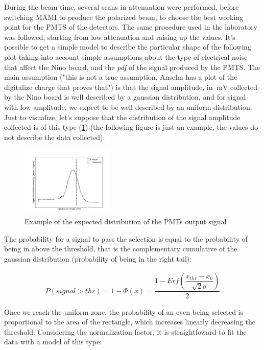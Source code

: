 During the beam time, several scans in attenuation were performed, before switching MAMI to produce the polarized beam, to choose the best working point for the PMTS of the detectors. The same procedure used in the laboratory was followed, starting from low attenuation and raising up the values. It's possible to get a simple model to describe the particular shape of the following plot taking into account simple assumptions about the type of electrical noise that affect the Nino board, and the \textit{pdf} of the signal produced by the PMTS.
The main assumption ("this is not a true assumption, Anselm has a plot of the digitalize charge that proves that") is that the signal amplitude, in $\SI{}{\milli \volt}$ collected by the Nino board is well described by a gaussian distribution, and for signal with low amplitude, we expect to be well described by an uniform distribution. Just to visualize, let's suppose that the distribution of the signal amplitude collected is of this type (\ref{fig:PDF}) (the following figure is just an example, the values ​​do not describe the data collected):

\begin{figure}[hbtp]
\centering
\includegraphics[width = 0.40\textwidth]{Analysis/distribution.pdf}
\caption{Example of the expected distribution of the PMTs output signal}
\label{fig:PDF}
\end{figure}

The probability for a signal to pass the selection is equal to the probability of being in above the threshold, that is the complementary cumulative of the gaussian distribution (probability of being in the right tail):

\begin{align*}
P(signal > thr) = 1 - \Phi(x) = \dfrac{1 - Erf(\dfrac{x_{thr} - x_{0}}{\sqrt{2} \sigma })}{2}
\end{align*}

Once we reach the uniform zone, the probability of an even being selected is proportional to the area of the rectangle, which increases linearly decreasing the threshold. Considering the normalization factor, it is straightfoward to fit the data with a model of this type:

